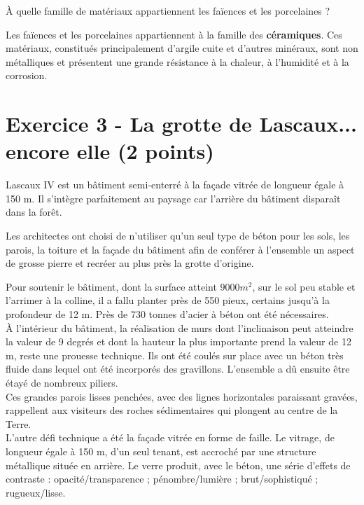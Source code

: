 \documentclass[answers]{exam}
\begin{document}
\begin{questions}
  \question[0.5] À quelle famille de matériaux appartiennent les faïences et les porcelaines ?
  \begin{solution}
  Les faïences et les porcelaines appartiennent à la famille des \textbf{céramiques}. Ces matériaux, constitués principalement d'argile cuite et d'autres minéraux, sont non métalliques et présentent une grande résistance à la chaleur, à l'humidité et à la corrosion.
  \end{solution}
\end{questions}

\section*{Exercice 3 - La grotte de Lascaux... encore elle (2 points)}


Lascaux IV est un bâtiment semi-enterré à la façade vitrée de longueur égale à 150 m.  
Il s'intègre parfaitement au paysage car l'arrière du bâtiment disparaît dans la forêt. \par
\vspace{1em}

Les architectes ont choisi de n'utiliser qu'un seul type de béton pour les sols, les parois, la toiture et la façade du bâtiment
afin de conférer à l'ensemble un aspect de grosse pierre et recréer au plus près la grotte d'origine.

\begin{tcolorbox}[colback=white, colframe=gray, coltitle=black, title=\textbf{Document 1 - Un chantier complexe}]
  Pour soutenir le bâtiment, dont la surface atteint $9000 m^2$, sur le sol peu stable et l'arrimer à la colline, il a fallu planter près de 550 pieux, certains jusqu'à la profondeur de 12 m.
  Près de 730 tonnes d'acier à béton ont été nécessaires. \\
  
  À l'intérieur du bâtiment, la réalisation de murs dont l'inclinaison peut atteindre la valeur de 9 degrés et dont la hauteur la plus importante prend la valeur de 12 m, reste une prouesse technique.
  Ils ont été coulés sur place avec un béton très fluide dans lequel ont été incorporés des gravillons.
  L'ensemble a dû ensuite être étayé de nombreux piliers. \\
  
  Ces grandes parois lisses penchées, avec des lignes horizontales paraissant gravées, rappellent aux visiteurs des roches sédimentaires qui plongent au centre de la Terre. \\

  L'autre défi technique a été la façade vitrée en forme de faille. Le vitrage, de longueur égale à 150 m, d'un seul tenant, est accroché par une structure métallique située en arrière.
  Le verre produit, avec le béton, une série d'effets de contraste : opacité/transparence ; pénombre/lumière ; brut/sophistiqué ; rugueux/lisse.
  \end{tcolorbox}
\end{document}
